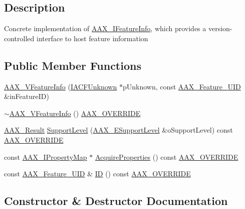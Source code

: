 \subsection{Description}
Concrete implementation of \mbox{\hyperlink{a01829}{A\+A\+X\+\_\+\+I\+Feature\+Info}}, which provides a version-\/controlled interface to host feature information \subsection*{Public Member Functions}
\begin{DoxyCompactItemize}
\item 
\mbox{\hyperlink{a01917_a329856dcf8790714643cfd8ef73d24ba}{A\+A\+X\+\_\+\+V\+Feature\+Info}} (\mbox{\hyperlink{a01409}{I\+A\+C\+F\+Unknown}} $\ast$p\+Unknown, const \mbox{\hyperlink{a00392_a53d6cf8a08224b3e813333e411ce798e}{A\+A\+X\+\_\+\+Feature\+\_\+\+U\+ID}} \&in\+Feature\+ID)
\item 
\mbox{\hyperlink{a01917_a96dc62d63f238e0d1c1778c7da749f0a}{$\sim$\+A\+A\+X\+\_\+\+V\+Feature\+Info}} () \mbox{\hyperlink{a00392_ac2f24a5172689ae684344abdcce55463}{A\+A\+X\+\_\+\+O\+V\+E\+R\+R\+I\+DE}}
\item 
\mbox{\hyperlink{a00392_a4d8f69a697df7f70c3a8e9b8ee130d2f}{A\+A\+X\+\_\+\+Result}} \mbox{\hyperlink{a01917_ad801aa95cc3b8956ca589e28d58acbc7}{Support\+Level}} (\mbox{\hyperlink{a00491_aca7bf42860665d5da66f4ac342e761b3}{A\+A\+X\+\_\+\+E\+Support\+Level}} \&o\+Support\+Level) const \mbox{\hyperlink{a00392_ac2f24a5172689ae684344abdcce55463}{A\+A\+X\+\_\+\+O\+V\+E\+R\+R\+I\+DE}}
\item 
const \mbox{\hyperlink{a01869}{A\+A\+X\+\_\+\+I\+Property\+Map}} $\ast$ \mbox{\hyperlink{a01917_a021eb7c27054e8ee67dbc0f8d314960c}{Acquire\+Properties}} () const \mbox{\hyperlink{a00392_ac2f24a5172689ae684344abdcce55463}{A\+A\+X\+\_\+\+O\+V\+E\+R\+R\+I\+DE}}
\item 
const \mbox{\hyperlink{a00392_a53d6cf8a08224b3e813333e411ce798e}{A\+A\+X\+\_\+\+Feature\+\_\+\+U\+ID}} \& \mbox{\hyperlink{a01917_ae561b74fa6ff031140d67a4f26030669}{ID}} () const \mbox{\hyperlink{a00392_ac2f24a5172689ae684344abdcce55463}{A\+A\+X\+\_\+\+O\+V\+E\+R\+R\+I\+DE}}
\end{DoxyCompactItemize}


\subsection{Constructor \& Destructor Documentation}
\mbox{\label{a01917_a329856dcf8790714643cfd8ef73d24ba}} 

